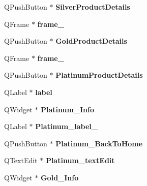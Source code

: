 \begin{DoxyCompactItemize}
Q\+Push\+Button $\ast$ {\bfseries Silver\+Product\+Details}
\item 
\mbox{\label{class_ui___main_interface_ad44f4048494d91cc7db9fec4394717f1}} 
Q\+Frame $\ast$ {\bfseries frame\+\_}
\item 
\mbox{\label{class_ui___main_interface_a3bfa464ad244acd4f3ae4819343b4a71}} 
Q\+Push\+Button $\ast$ {\bfseries Gold\+Product\+Details}
\item 
\mbox{\label{class_ui___main_interface_a6bf76ea8a572ecff394d149f6c1df6e9}} 
Q\+Frame $\ast$ {\bfseries frame\+\_}
\item 
\mbox{\label{class_ui___main_interface_a5d2d344d0dcc33f5120764885f488384}} 
Q\+Push\+Button $\ast$ {\bfseries Platinum\+Product\+Details}
\item 
\mbox{\label{class_ui___main_interface_af357dbf04624a34e5b4fb4f9ab9c140f}} 
Q\+Label $\ast$ {\bfseries label}
\item 
\mbox{\label{class_ui___main_interface_a24d9cbd0574c30e68689006121c2a472}} 
Q\+Widget $\ast$ {\bfseries Platinum\+\_\+\+Info}
\item 
\mbox{\label{class_ui___main_interface_aab18a4def2b0093b1012472827e5a4e7}} 
Q\+Label $\ast$ {\bfseries Platinum\+\_\+label\+\_}
\item 
\mbox{\label{class_ui___main_interface_a3064b2d79729ffdd74344db732c13e50}} 
Q\+Push\+Button $\ast$ {\bfseries Platinum\+\_\+\+Back\+To\+Home}
\item 
\mbox{\label{class_ui___main_interface_a3a3b7271d91a71844d775f2bd10c7321}} 
Q\+Text\+Edit $\ast$ {\bfseries Platinum\+\_\+text\+Edit}
\item 
\mbox{\label{class_ui___main_interface_a3485d9472629371d675605a1df70f52f}} 
Q\+Widget $\ast$ {\bfseries Gold\+\_\+\+Info}
\item 
\mbox{\label{class_ui___main_interface_a0603422af5909d5454a2004d7ab1f4fd}} 

\end{DoxyCompactItemize}
